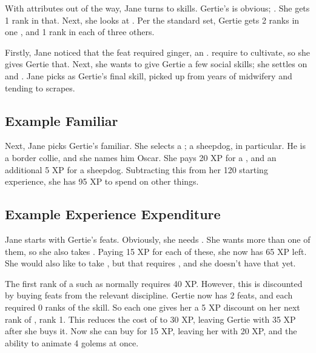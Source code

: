 With attributes out of the way, Jane turns to skills.
Gertie's {\specialityskill} is obvious; .
She gets 1 rank in that.
Next, she looks at {\generalskills}.
Per the standard set, Gertie gets 2 ranks in one {\generalskill}, and 1 rank in each of three others.

Firstly, Jane noticed that the  feat required ginger, an .
 require  to cultivate, so she gives Gertie that.
Next, she wants to give Gertie a few social skills; she settles on  and .
Jane picks  as Gertie's final skill, picked up from years of midwifery and tending to scrapes.

\subsection{Example Familiar}

Next, Jane picks Gertie's familiar.
She selects a ; a sheepdog, in particular.
He is a border collie, and she names him Oscar.
She pays 20 XP for a , and an additional 5 XP for a sheepdog.
Subtracting this from her 120 starting experience, she has 95 XP to spend on other things.

\subsection{Example Experience Expenditure}

Jane starts with Gertie's feats.
Obviously, she needs .
She wants more than one of them, so she also takes .
Paying 15 XP for each of these, she now has 65 XP left.
She would also like to take , but that requires , and she doesn't have that yet.

The first rank of a {\disciplineskill} such as  normally requires 40 XP.
However, this is discounted by buying feats from the relevant discipline.
Gertie now has 2  feats, and each required 0 ranks of the  skill.
So each one gives her a 5 XP discount on her next rank of , rank 1.
This reduces the cost of  to 30 XP, leaving Gertie with 35 XP after she buys it.
Now she can buy  for 15 XP, leaving her with 20 XP, and the ability to animate 4 golems at once.

